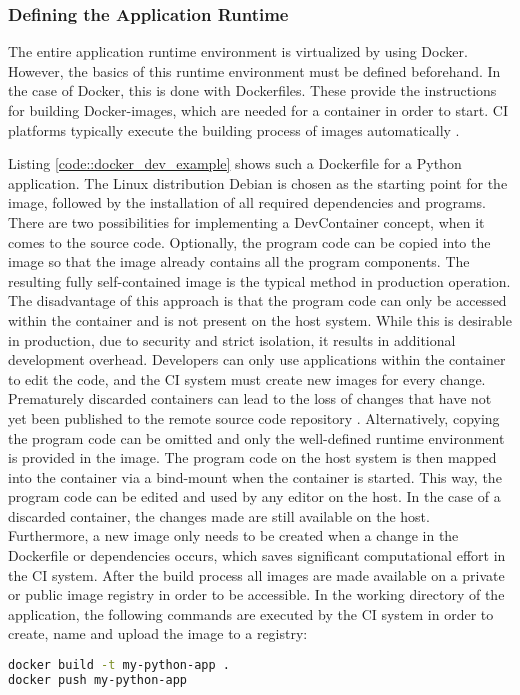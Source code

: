         \subsubsection{Defining the Application Runtime}
        The entire application runtime environment is virtualized by using Docker. However, the basics of this runtime environment must be defined beforehand. In the case of Docker, this is done with Dockerfiles. These provide the instructions for building Docker-images, which are needed for a container in order to start. \ac{CI} platforms typically execute the building process of images automatically \cite{docker2020}.\newline
        
        Listing \ref{code::docker_dev_example} shows such a Dockerfile for a Python application. The Linux distribution Debian is chosen as the starting point for the image, followed by the installation of all required dependencies and programs. There are two possibilities for implementing a DevContainer concept, when it comes to the source code. Optionally, the program code can be copied into the image so that the image already contains all the program components. The resulting fully self-contained image is the typical method in production operation. The disadvantage of this approach is that the program code can only be accessed within the container and is not present on the host system. While this is desirable in production, due to security and strict isolation, it results in additional development overhead. Developers can only use applications within the container to edit the code, and the \ac{CI} system must create new images for every change. Prematurely discarded containers can lead to the loss of changes that have not yet been published to the remote source code repository \cite{dockerdocs}.\newline
        Alternatively, copying the program code can be omitted and only the well-defined runtime environment is provided in the image. The program code on the host system is then mapped into the container via a bind-mount when the container is started. This way, the program code can be edited and used by any editor on the host. In the case of a discarded container, the changes made are still available on the host. Furthermore, a new image only needs to be created when a change in the Dockerfile or dependencies occurs, which saves significant computational effort in the \ac{CI} system. After the build process all images are made available on a private or public image registry in order to be accessible. In the working directory of the application, the following commands are executed by the \ac{CI} system in order to create, name and upload the image to a registry:
        \begin{lstlisting}[language=bash, frame=none, numbers=none, backgroundcolor=\color{codebg}]
docker build -t my-python-app .
docker push my-python-app
        \end{lstlisting}
        \vspace{-1cm}

